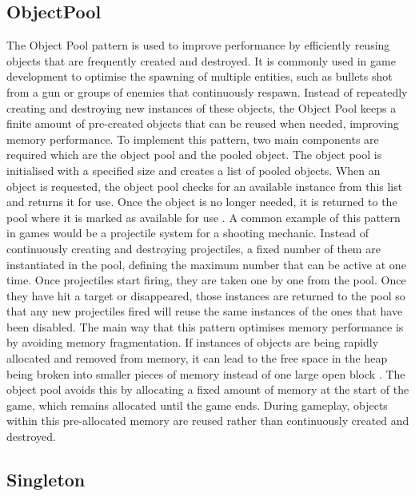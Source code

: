 \documentclass[10pt]{final_report}
\begin{document}
\subsection{ObjectPool}\label{objectpool}
The Object Pool pattern is used to improve performance by efficiently reusing objects that are frequently created and destroyed. It is commonly used in game development to optimise the spawning of multiple entities, such as bullets shot from a gun or groups of enemies that continuously respawn. Instead of repeatedly creating and destroying new instances of these objects, the Object Pool keeps a finite amount of pre-created objects that can be reused when needed, improving memory performance.
\newline
To implement this pattern, two main components are required which are the object pool and the pooled object. The object pool is initialised with a specified size and creates a list of pooled objects. When an object is requested, the object pool checks for an available instance from this list and returns it for use. Once the object is no longer needed, it is returned to the pool where it is marked as available for use \cite{Doran2017}. 
\newline
A common example of this pattern in games would be a projectile system for a shooting mechanic. Instead of continuously creating and destroying projectiles, a fixed number of them are instantiated in the pool, defining the maximum number that can be active at one time. Once projectiles start firing, they are taken one by one from the pool. Once they have hit a target or disappeared, those instances are returned to the pool so that any new projectiles fired will reuse the same instances of the ones that have been disabled. 
\newline
The main way that this pattern optimises memory performance is by avoiding memory fragmentation. If instances of objects are being rapidly allocated and removed from memory, it can lead to the free space in the heap being broken into smaller pieces of memory instead of one large open block \cite{nystrom2011game}. The object pool avoids this by allocating a fixed amount of memory at the start of the game, which remains allocated until the game ends. During gameplay, objects within this pre-allocated memory are reused rather than continuously created and destroyed.

\subsection{Singleton}\label{singleton}
\end{document}
